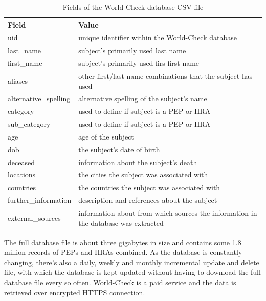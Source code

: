 \documentclass[a4paper, oneside]{csthesis}
\begin{document}
\begin{table}
    \begin{tabular}{l|p{9cm}}
    \hline
    Field & Value \\ \hline
    uid & unique identifier within the World-Check database\\ \hdashline[0.5pt/3pt]
    last\_name & subject's primarily used last name\\ \hdashline[0.5pt/3pt]
    first\_name & subject's primarily used firs first name \\ \hdashline[0.5pt/3pt]
    aliases & other first/last name combinations that the subject has used\\ \hdashline[0.5pt/3pt]
    alternative\_spelling & alternative spelling of the subject's name\\ \hdashline[0.5pt/3pt]
    category & used to define if subject is a PEP or HRA\\ \hdashline[0.5pt/3pt]
    sub\_category & used to define if subject is a PEP or HRA\\ \hdashline[0.5pt/3pt]
    age & age of the subject \\ \hdashline[0.5pt/3pt]
    dob & the subject's date of birth \\ \hdashline[0.5pt/3pt]
    deceased & information about the subject's death \\ \hdashline[0.5pt/3pt]
    locations & the cities the subject was associated with \\ \hdashline[0.5pt/3pt]
    countries & the countries the subject was associated with \\ \hdashline[0.5pt/3pt]
    further\_information & description and references about the subject \\ \hdashline[0.5pt/3pt]
    external\_sources & information about from which sources the information in the database was extracted \\ \hline

    \end{tabular}

    \caption{Fields of the World-Check database CSV file}
    \label{tbl:world-check-fields}
\end{table}


The full database file is about three gigabytes in size and contains some 1.8 million records of PEPs and HRAs combined. As the database is constantly changing, there's also a daily, weekly and monthly incremental update and delete file, with which the database is kept updated without having to download the full database file every so often.
World-Check is a paid service and the data is retrieved over encrypted HTTPS connection.
\end{document}
